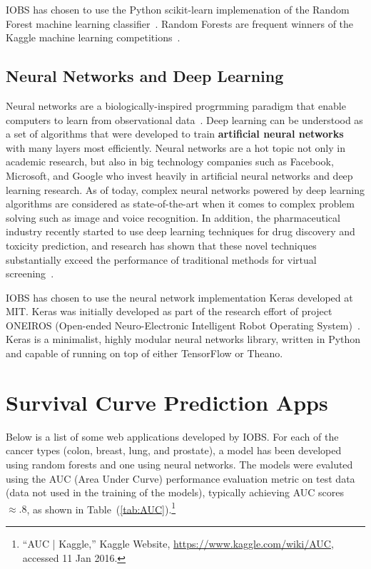 \documentclass[a4paper,11pt]{article}
\begin{document}
IOBS has chosen to use the Python scikit-learn implemenation of the Random Forest machine learning classifier~\cite{rf}.
Random Forests are frequent winners of the Kaggle machine learning competitions~\cite{kagglerf}.




\subsection{Neural Networks and Deep Learning}

Neural networks are a biologically-inspired progrmming paradigm that enable computers to learn from observational data~\cite{deeplearning}.
Deep learning can be understood as a set of algorithms that were developed to train \textbf{artificial neural networks} with many layers most efficiently.
 Neural networks are a hot topic not only in academic research, but also in big technology companies such as Facebook, Microsoft, and Google who invest heavily in artificial neural networks and deep learning research. As of today, complex neural networks powered by deep learning algorithms are considered as state-of-the-art when it comes to complex problem solving such as image and voice recognition.
In addition, the pharmaceutical industry recently started to use deep learning techniques for drug discovery and toxicity prediction, and research has shown that these novel techniques substantially exceed the performance of traditional methods for virtual screening~\cite{toxicity}.

IOBS has chosen to use the neural network implementation Keras developed at MIT.
Keras was initially developed as part of the research effort of project ONEIROS (Open-ended Neuro-Electronic Intelligent Robot Operating System)~\cite{keras}.
Keras is a minimalist, highly modular neural networks library, written in Python and capable of running on top of either TensorFlow or Theano.

\section{Survival Curve Prediction Apps}

Below is a list of some web applications developed by IOBS.
For each of the cancer types (colon, breast, lung, and prostate), a model has been developed using random forests and one using neural networks. The models were evaluted using the AUC (Area Under Curve) performance evaluation metric on test data (data not used in the training of the models), typically achieving AUC scores  $\approx .8$, as shown in Table~(\ref{tab:AUC}).\footnote{``AUC | Kaggle,'' Kaggle Website, \url{https://www.kaggle.com/wiki/AUC}, accessed 11 Jan 2016.}
 
\end{document}
